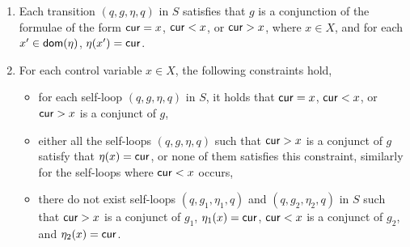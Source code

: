 \begin{enumerate}
\item Each transition $(q, g, \eta, q)$ in $S$ satisfies that $g$ is a conjunction of the formulae of the form $\mathsf{cur} = x$, $\mathsf{cur} < x$, or $\mathsf{cur} > x$, where $x \in X$, and for each $x' \in \mathsf{dom}(\eta)$, $\eta(x')=\mathsf{cur}$.

\item For each control variable $x \in X$, the following constraints hold,
\begin{itemize}
\item for each self-loop $(q, g, \eta, q)$ in $S$, it holds that $\mathsf{cur} = x$, $\mathsf{cur}< x$, or $\mathsf{cur} > x$ is a conjunct of $g$, 
%
\item either all the self-loops $(q, g, \eta, q)$ such that $\mathsf{cur} > x$ is a conjunct of $g$ satisfy that $\eta(x)=\mathsf{cur}$, or none of them satisfies this constraint, similarly for the self-loops where $\mathsf{cur} < x$ occurs,

%
\item there do not exist self-loops $(q, g_1, \eta_1, q)$ and $(q, g_2, \eta_2,q)$ in $S$ such that $\mathsf{cur} > x$ is a conjunct of $g_1$, $\eta_1(x)=\mathsf{cur}$, $\mathsf{cur} < x$ is a conjunct of $g_2$, and $\eta_2(x)=\mathsf{cur}$.
%
\end{itemize}
\end{enumerate}


